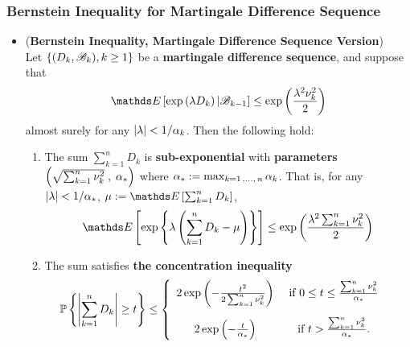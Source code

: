 \documentclass[11pt]{article}
\begin{document}
\subsubsection{Bernstein Inequality for Martingale Difference Sequence}
\begin{itemize}
\item \begin{proposition} (\textbf{Bernstein Inequality, Martingale Difference Sequence Version}) \citep{wainwright2019high}\\
Let $\left\{(D_k, {\mathscr B}_k), k \ge 1\right\}$ be a \textbf{martingale difference sequence}, and suppose that 
\begin{align*}
\E{}{\exp\paren{\lambda D_k} | \srB_{k-1}} \le \exp\paren{\frac{\lambda^2 \nu_k^2}{2} }
\end{align*} almost surely for any $\left\lvert \lambda \right\rvert < 1/\alpha_k$. Then the following hold:
\begin{enumerate}
\item The sum $\sum_{k=1}^{n}D_k$ is \textbf{sub-exponential} with \textbf{parameters} $\left(\sqrt{\sum_{k=1}^{n}\nu_k^2}\;  , \;\alpha_{*}\right)$ where $\alpha_{*} := \max_{k=1 \,{,}\ldots{,}\, n} \alpha_k$. That is, for any $\left\lvert \lambda \right\rvert < 1/\alpha_{*}$, $\mu := \E{}{\sum_{k=1}^{n}D_k}$,
\begin{align*}
\E{}{\exp\set{\lambda \paren{\sum_{k=1}^{n}D_k - \mu}}} \le \exp\paren{\frac{\lambda^2\sum_{k=1}^{n}\nu_k^2}{2} }
\end{align*}
\item The sum satisfies \textbf{the concentration inequality}
\begin{align}
{\mathbb P}\left\{\left\lvert \sum_{k=1}^{n}D_k \right\rvert \ge t \right\} &\le \left\{ \begin{array}{cc}
2 \exp\left(- \frac{t^2}{2 \sum_{k=1}^{n}\nu_k^2}\right) & \text{ if } 0 \le t \le \frac{\sum_{k=1}^{n}\nu_k^2}{\alpha_{*}} \\[15pt]
2 \exp\left(- \frac{t}{\alpha_{*}}\right) &\text{ if } t > \frac{\sum_{k=1}^{n}\nu_k^2}{\alpha_{*}}.
\end{array}\right. \label{ineqn: bernstein_inequality_martingale}
\end{align}
\end{enumerate}
\end{proposition}
\end{itemize}
\end{document}
